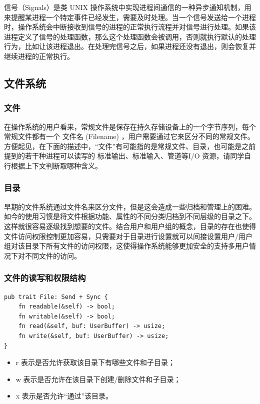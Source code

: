 信号（Signals）是类 UNIX 操作系统中实现进程间通信的一种异步通知机制，用来提醒某进程一个特定事件已经发生，需要及时处理。当一个信号发送给一个进程时，操作系统会中断接收到信号的进程的正常执行流程并对信号进行处理。如果该进程定义了信号的处理函数，那么这个处理函数会被调用，否则就执行默认的处理行为，比如让该进程退出。在处理完信号之后，如果进程还没有退出，则会恢复并继续进程的正常执行。

\subsection{文件系统}


\subsubsection{文件}

在操作系统的用户看来，常规文件是保存在持久存储设备上的一个字节序列，每个常规文件都有一个 文件名 (Filename) ，用户需要通过它来区分不同的常规文件。方便起见，在下面的描述中，“文件”有可能指的是常规文件、目录，也可能是之前提到的若干种进程可以读写的 标准输出、标准输入、管道等I/O 资源，请同学自行根据上下文判断取哪种含义。

\subsubsection{目录}

早期的文件系统通过文件名来区分文件，但是这会造成一些归档和管理上的困难。如今的使用习惯是将文件根据功能、属性的不同分类归档到不同层级的目录之下。这样就很容易逐级找到想要的文件。结合用户和用户组的概念，目录的存在也使得文件访问权限控制更加容易，只需要对于目录进行设置就可以间接设置用户/用户组对该目录下所有文件的访问权限，这使得操作系统能够更加安全的支持多用户情况下对不同文件的访问。

\subsubsection{文件的读写和权限结构}

\begin{lstlisting}[caption=文件系统基本读写]
pub trait File: Send + Sync {
    fn readable(&self) -> bool;
    fn writable(&self) -> bool;
    fn read(&self, buf: UserBuffer) -> usize;
    fn write(&self, buf: UserBuffer) -> usize;
}
\end{lstlisting}

\begin{itemize}
\item r 表示是否允许获取该目录下有哪些文件和子目录；
\item w 表示是否允许在该目录下创建/删除文件和子目录；
\item x 表示是否允许“通过”该目录。
\end{itemize}


